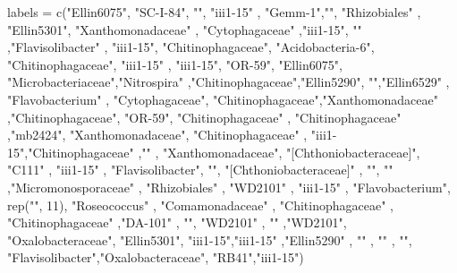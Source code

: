 \documentclass[]{interact}
\theoremstyle{plain}%
\theoremstyle{definition}
\theoremstyle{remark}
\newenvironment{Shaded}{\begin{snugshade}}{\end{snugshade}}
\newcommand{\DecValTok}[1]{\textcolor[rgb]{0.00,0.00,0.81}{#1}}
\newcommand{\FunctionTok}[1]{\textcolor[rgb]{0.00,0.00,0.00}{#1}}
\newcommand{\NormalTok}[1]{#1}
\newcommand{\OtherTok}[1]{\textcolor[rgb]{0.56,0.35,0.01}{#1}}
\newcommand{\StringTok}[1]{\textcolor[rgb]{0.31,0.60,0.02}{#1}}
\begin{document}
\begin{Shaded}
\begin{Highlighting}[]
\NormalTok{labels }\OtherTok{=} \FunctionTok{c}\NormalTok{(}\StringTok{"Ellin6075"}\NormalTok{, }\StringTok{"SC{-}I{-}84"}\NormalTok{, }\StringTok{""}\NormalTok{, }\StringTok{"iii1{-}15"}\NormalTok{ ,  }\StringTok{"Gemm{-}1"}\NormalTok{,}\StringTok{""}\NormalTok{, }
\StringTok{"Rhizobiales"}\NormalTok{ , }\StringTok{"Ellin5301"}\NormalTok{,  }\StringTok{"Xanthomonadaceae"}\NormalTok{  , }
\StringTok{"Cytophagaceae"}\NormalTok{ ,}\StringTok{"iii1{-}15"}\NormalTok{, }\StringTok{""}\NormalTok{ ,}\StringTok{"Flavisolibacter"}\NormalTok{ , }\StringTok{"iii1{-}15"}\NormalTok{, }\StringTok{"Chitinophagaceae"}\NormalTok{,}
\StringTok{"Acidobacteria{-}6"}\NormalTok{,  }\StringTok{"Chitinophagaceae"}\NormalTok{, }\StringTok{"iii1{-}15"}\NormalTok{ , }\StringTok{"iii1{-}15"}\NormalTok{, }\StringTok{"OR{-}59"}\NormalTok{, }\StringTok{"Ellin6075"}\NormalTok{, }
\StringTok{"Microbacteriaceae"}\NormalTok{,}\StringTok{"Nitrospira"}\NormalTok{ ,}\StringTok{"Chitinophagaceae"}\NormalTok{,}\StringTok{"Ellin5290"}\NormalTok{,  }\StringTok{""}\NormalTok{,}\StringTok{"Ellin6529"}\NormalTok{ ,}
\StringTok{"Flavobacterium"}\NormalTok{  , }\StringTok{"Cytophagaceae"}\NormalTok{, }\StringTok{"Chitinophagaceae"}\NormalTok{,}\StringTok{"Xanthomonadaceae"}\NormalTok{ ,}\StringTok{"Chitinophagaceae"}\NormalTok{, }
\StringTok{"OR{-}59"}\NormalTok{,  }\StringTok{"Chitinophagaceae"}\NormalTok{  ,  }\StringTok{"Chitinophagaceae"}\NormalTok{ ,}\StringTok{"mb2424"}\NormalTok{, }
\StringTok{"Xanthomonadaceae"}\NormalTok{, }\StringTok{"Chitinophagaceae"}\NormalTok{  ,  }\StringTok{"iii1{-}15"}\NormalTok{,}\StringTok{"Chitinophagaceae"}\NormalTok{ ,}\StringTok{""}\NormalTok{  , }\StringTok{"Xanthomonadaceae"}\NormalTok{,}
\StringTok{"[Chthoniobacteraceae]"}\NormalTok{,  }\StringTok{"C111"}\NormalTok{  ,  }\StringTok{"iii1{-}15"}\NormalTok{  , }\StringTok{"Flavisolibacter"}\NormalTok{,  }\StringTok{""}\NormalTok{,  }\StringTok{"[Chthoniobacteraceae]"}\NormalTok{ ,}
\StringTok{""}\NormalTok{, }\StringTok{""}\NormalTok{ ,}\StringTok{"Micromonosporaceae"}\NormalTok{ , }\StringTok{"Rhizobiales"}\NormalTok{  , }\StringTok{"WD2101"}\NormalTok{ , }\StringTok{"iii1{-}15"}\NormalTok{ ,  }
\StringTok{"Flavobacterium"}\NormalTok{, }\FunctionTok{rep}\NormalTok{(}\StringTok{""}\NormalTok{, }\DecValTok{11}\NormalTok{), }\StringTok{"Roseococcus"}\NormalTok{  , }\StringTok{"Comamonadaceae"}\NormalTok{ ,  }\StringTok{"Chitinophagaceae"}\NormalTok{ ,  }
\StringTok{"Chitinophagaceae"}\NormalTok{ ,}\StringTok{"DA{-}101"}\NormalTok{ ,  }\StringTok{""}\NormalTok{, }\StringTok{"WD2101"}\NormalTok{ , }\StringTok{""}\NormalTok{  ,}\StringTok{"WD2101"}\NormalTok{, }
\StringTok{"Oxalobacteraceae"}\NormalTok{, }\StringTok{"Ellin5301"}\NormalTok{,  }\StringTok{"iii1{-}15"}\NormalTok{,}\StringTok{"iii1{-}15"}\NormalTok{ ,}\StringTok{"Ellin5290"}\NormalTok{ , }\StringTok{""}\NormalTok{ ,}
\StringTok{""}\NormalTok{ , }\StringTok{""}\NormalTok{, }\StringTok{"Flavisolibacter"}\NormalTok{,}\StringTok{"Oxalobacteraceae"}\NormalTok{, }\StringTok{"RB41"}\NormalTok{,}\StringTok{"iii1{-}15"}\NormalTok{) }


\end{Highlighting}
\end{Shaded}
\end{document}
